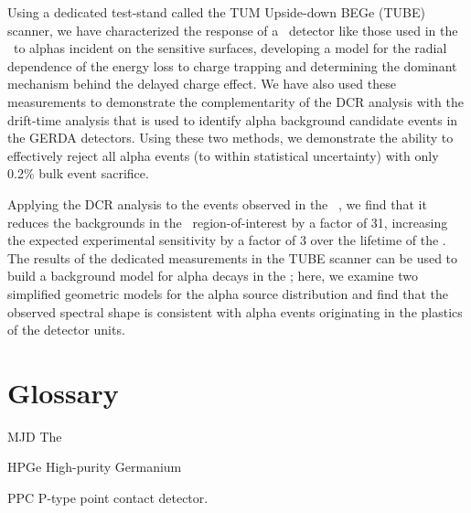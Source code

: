 {Using a dedicated test-stand called the TUM Upside-down BEGe (TUBE) scanner, we have characterized the response of a \ppc\ detector like those used in the \DEM\ to alphas incident on the sensitive surfaces, developing a model for the radial dependence of the energy loss to charge trapping and determining the dominant mechanism behind the delayed charge effect. We have also used these measurements to demonstrate the complementarity of the DCR analysis with the drift-time analysis that is used to identify alpha background candidate events in the GERDA detectors. Using these two methods, we demonstrate the ability to effectively reject all alpha events (to within statistical uncertainty) with only 0.2\% bulk event sacrifice. 

Applying the DCR analysis to the events observed in the \MJ\ \DEM, we find that it reduces the backgrounds in the \nonubb\ region-of-interest by a factor of 31, increasing the expected experimental sensitivity by a factor of 3 over the lifetime of the \DEM. The results of the dedicated measurements in the TUBE scanner can be used to build a background model for alpha decays in the \DEM ; here, we examine two simplified geometric models for the alpha source distribution and find that the observed spectral shape is consistent with alpha events originating in the plastics of the detector units. 
 }
%
%
\tableofcontents
\listoffigures
\listoftables  %
 
%
%
\chapter*{Glossary}      %
\thispagestyle{plain}
%
\begin{glossary}
\item[MJD] The \MJ\ \MJDemo\ 
\item[HPGe] High-purity Germanium
\item[PPC] P-type point contact detector.
\end{glossary}
